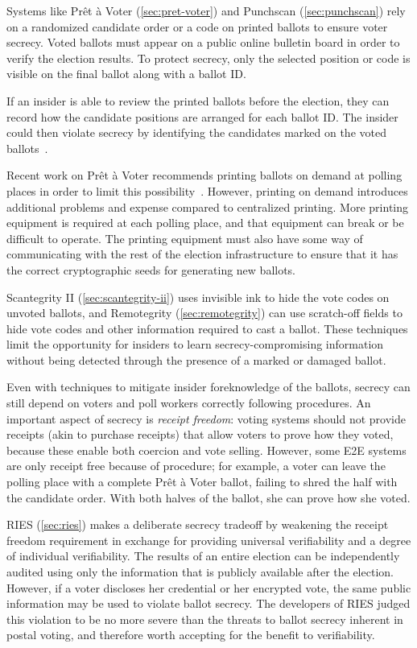 Systems like Prêt à Voter (\autoref{sec:pret-voter}) and Punchscan
(\autoref{sec:punchscan}) rely on a randomized candidate order or a
code on printed ballots to ensure voter secrecy. Voted ballots must
appear on a public online bulletin board in order to verify the
election results. To protect secrecy, only the selected position or
code is visible on the final ballot along with a ballot ID.

If an insider is able to review the printed ballots before the
election, they can record how the candidate positions are arranged for
each ballot ID. The insider could then violate secrecy by identifying
the candidates marked on the voted ballots~\cite{burton2012}.

Recent work on Prêt à Voter recommends printing ballots on demand at
polling places in order to limit this
possibility~\cite{ryan2009}. However, printing on demand introduces
additional problems and expense compared to centralized printing. More
printing equipment is required at each polling place, and that
equipment can break or be difficult to operate. The printing equipment
must also have some way of communicating with the rest of the election
infrastructure to ensure that it has the correct cryptographic seeds
for generating new ballots.

Scantegrity II (\autoref{sec:scantegrity-ii}) uses invisible ink to
hide the vote codes on unvoted ballots, and Remotegrity
(\autoref{sec:remotegrity}) can use scratch-off fields to hide vote
codes and other information required to cast a ballot. These
techniques limit the opportunity for insiders to learn
secrecy-compromising information without being detected through the
presence of a marked or damaged ballot.

Even with techniques to mitigate insider foreknowledge of the ballots,
secrecy can still depend on voters and poll workers correctly
following procedures. An important aspect of secrecy is \emph{receipt
  freedom}: voting systems should not provide receipts (akin to
purchase receipts) that allow voters to prove how they voted, because
these enable both coercion and vote selling. However, some E2E systems
are only receipt free because of procedure; for example, a voter can
leave the polling place with a complete Prêt à Voter ballot, failing
to shred the half with the candidate order. With both halves of the
ballot, she can prove how she voted.

RIES (\autoref{sec:ries}) makes a deliberate secrecy tradeoff by
weakening the receipt freedom requirement in exchange for providing
universal verifiability and a degree of individual verifiability. The
results of an entire election can be independently audited using only
the information that is publicly available after the
election. However, if a voter discloses her credential or her
encrypted vote, the same public information may be used to violate
ballot secrecy. The developers of RIES judged this violation to be no
more severe than the threats to ballot secrecy inherent in postal
voting, and therefore worth accepting for the benefit to
verifiability.

